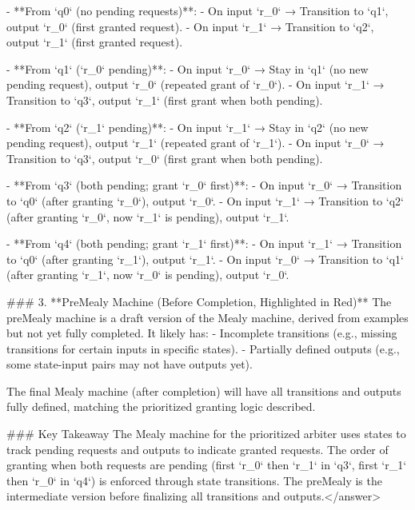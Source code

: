 - **From `q0` (no pending requests)**:  
  - On input `r_0` → Transition to `q1`, output `r_0` (first granted request).  
  - On input `r_1` → Transition to `q2`, output `r_1` (first granted request).  

- **From `q1` (`r_0` pending)**:  
  - On input `r_0` → Stay in `q1` (no new pending request), output `r_0` (repeated grant of `r_0`).  
  - On input `r_1` → Transition to `q3`, output `r_1` (first grant when both pending).  

- **From `q2` (`r_1` pending)**:  
  - On input `r_1` → Stay in `q2` (no new pending request), output `r_1` (repeated grant of `r_1`).  
  - On input `r_0` → Transition to `q3`, output `r_0` (first grant when both pending).  

- **From `q3` (both pending; grant `r_0` first)**:  
  - On input `r_0` → Transition to `q0` (after granting `r_0`), output `r_0`.  
  - On input `r_1` → Transition to `q2` (after granting `r_0`, now `r_1` is pending), output `r_1`.  

- **From `q4` (both pending; grant `r_1` first)**:  
  - On input `r_1` → Transition to `q0` (after granting `r_1`), output `r_1`.  
  - On input `r_0` → Transition to `q1` (after granting `r_1`, now `r_0` is pending), output `r_0`.    


### 3. **PreMealy Machine (Before Completion, Highlighted in Red)**  
The preMealy machine is a draft version of the Mealy machine, derived from examples but not yet fully completed. It likely has:  
- Incomplete transitions (e.g., missing transitions for certain inputs in specific states).  
- Partially defined outputs (e.g., some state-input pairs may not have outputs yet).  

The final Mealy machine (after completion) will have all transitions and outputs fully defined, matching the prioritized granting logic described.    


### Key Takeaway  
The Mealy machine for the prioritized arbiter uses states to track pending requests and outputs to indicate granted requests. The order of granting when both requests are pending (first `r_0` then `r_1` in `q3`, first `r_1` then `r_0` in `q4`) is enforced through state transitions. The preMealy is the intermediate version before finalizing all transitions and outputs.</answer>